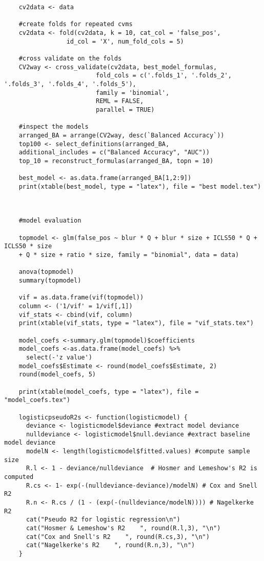 \documentclass[12pt]{article}
\begin{document}
\begin{verbatim}
	cv2data <- data
	
	#create folds for repeated cvms
	cv2data <- fold(cv2data, k = 10, cat_col = 'false_pos', 
				 id_col = 'X', num_fold_cols = 5)
	
	#cross validate on the folds
	CV2way <- cross_validate(cv2data, best_model_formulas,
						 fold_cols = c('.folds_1', '.folds_2', '.folds_3', '.folds_4', '.folds_5'),
						 family = 'binomial',
						 REML = FALSE,
						 parallel = TRUE)
	
	#inspect the models
	arranged_BA = arrange(CV2way, desc(`Balanced Accuracy`))
	top100 <- select_definitions(arranged_BA, 
	additional_includes = c("Balanced Accuracy", "AUC"))
	top_10 = reconstruct_formulas(arranged_BA, topn = 10)
	
	best_model <- as.data.frame(arranged_BA[1,2:9])
	print(xtable(best_model, type = "latex"), file = "best model.tex")
	

	
	#model evaluation

	topmodel <- glm(false_pos ~ blur * Q + blur * size + ICLS50 * Q + ICLS50 * size 
	+ Q * size + ratio * size, family = "binomial", data = data)
	
	anova(topmodel)
	summary(topmodel)
	
	vif = as.data.frame(vif(topmodel))
	column <- ('1/vif' = 1/vif[,1])
	vif_stats <- cbind(vif, column)
	print(xtable(vif_stats, type = "latex"), file = "vif_stats.tex")
	
	model_coefs <-summary.glm(topmodel)$coefficients
	model_coefs <-as.data.frame(model_coefs) %>% 
	  select(-'z value')
	model_coefs$Estimate <- round(model_coefs$Estimate, 2)
	round(model_coefs, 5)
	
	print(xtable(model_coefs, type = "latex"), file = "model_coefs.tex")
	
	logisticpseudoR2s <- function(logisticmodel) {
	  deviance <- logisticmodel$deviance #extract model deviance
	  nulldeviance <- logisticmodel$null.deviance #extract baseline model deviance
	  modelN <- length(logisticmodel$fitted.values) #compute sample size
	  R.l <- 1 - deviance/nulldeviance  # Hosmer and Lemeshow's R2 is computed
	  R.cs <- 1- exp(-(nulldeviance-deviance)/modelN) # Cox and Snell R2
	  R.n <- R.cs / (1 - (exp(-(nulldeviance/modelN)))) # Nagelkerke R2
	  cat("Pseudo R2 for logistic regression\n")
	  cat("Hosmer & Lemeshow's R2    ", round(R.l,3), "\n")
	  cat("Cox and Snell's R2    ", round(R.cs,3), "\n")
	  cat("Nagelkerke's R2    ", round(R.n,3), "\n")
	}
	

\end{verbatim}
\end{document}
